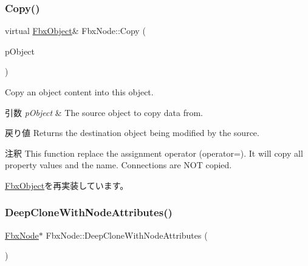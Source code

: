 \subsubsection{\texorpdfstring{Copy()}{Copy()}}
{\footnotesize\ttfamily virtual \hyperlink{class_fbx_object}{Fbx\+Object}\& Fbx\+Node\+::\+Copy (\begin{DoxyParamCaption}\item[{const \hyperlink{class_fbx_object}{Fbx\+Object} \&}]{p\+Object }\end{DoxyParamCaption})\hspace{0.3cm}{\ttfamily [virtual]}}

Copy an object content into this object. 
\begin{DoxyParams}{引数}
{\em p\+Object} & The source object to copy data from. \\
\hline
\end{DoxyParams}
\begin{DoxyReturn}{戻り値}
Returns the destination object being modified by the source. 
\end{DoxyReturn}
\begin{DoxyRemark}{注釈}
This function replace the assignment operator (operator=). It will copy all property values and the name. Connections are N\+OT copied. 
\end{DoxyRemark}


\hyperlink{class_fbx_object_a0c0c5adb38284d14bb82c04d54504a3e}{Fbx\+Object}を再実装しています。

\mbox{\label{class_fbx_node_a40137ec5e59d6756452dfc4e65ae14cb}} 
\subsubsection{\texorpdfstring{Deep\+Clone\+With\+Node\+Attributes()}{DeepCloneWithNodeAttributes()}}
{\footnotesize\ttfamily \hyperlink{class_fbx_node}{Fbx\+Node}$\ast$ Fbx\+Node\+::\+Deep\+Clone\+With\+Node\+Attributes (\begin{DoxyParamCaption}{ }\end{DoxyParamCaption})}

\mbox{\label{class_fbx_node_a627ea87f8c93177343351bed8997d278}} 
